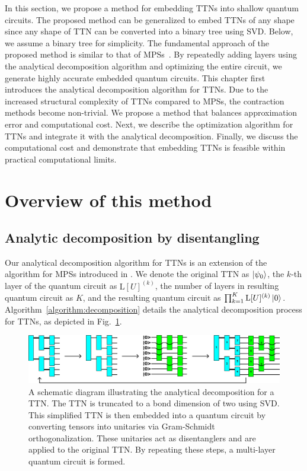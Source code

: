 \documentclass[12pt,dvipdfmx,twoside,openright]{report}
\begin{document}
In this section, we propose a method for embedding TTNs into shallow quantum circuits.
The proposed method can be generalized to embed TTNs of any shape since any shape of TTN can be converted into a binary tree using SVD.
Below, we assume a binary tree for simplicity.
The fundamental approach of the proposed method is similar to that of MPSs~\cite{mpsdecomp}. 
By repeatedly adding layers using the analytical decomposition algorithm and optimizing the entire circuit, we generate highly accurate embedded quantum circuits.
This chapter first introduces the analytical decomposition algorithm for TTNs.
Due to the increased structural complexity of TTNs compared to MPSs, the contraction methods become non-trivial. 
We propose a method that balances approximation error and computational cost.
Next, we describe the optimization algorithm for TTNs and integrate it with the analytical decomposition.
Finally, we discuss the computational cost and demonstrate that embedding TTNs is feasible within practical computational limits.

\section{Overview of this method}


\subsection{Analytic decomposition by disentangling}
Our analytical decomposition algorithm for TTNs is an extension of the algorithm for MPSs introduced in \cite{EncodingMPS}.
We denote the original TTN as $\ket{\psi_0}$, the $k$-th layer of the quantum circuit as $\mathrm{L}[U]^{(k)}$, the number of layers in resulting quantum circuit as $K$, and the resulting quantum circuit as $\prod_{k=1}^K \mathrm{L}[U]^{(k)}\ket{0}$.
Algorithm~\ref{algorithm:decomposition} details the analytical decomposition process for TTNs, as depicted in Fig.~\ref{fig:decomposition-a}.

\begin{figure}
    \centering
    \includegraphics[width=\linewidth]{fig-decomposition-a.pdf}
    \caption{A schematic diagram illustrating the analytical decomposition for a TTN.
    The TTN is truncated to a bond dimension of two using SVD. This simplified TTN is then embedded into a quantum circuit by converting tensors into unitaries via Gram-Schmidt orthogonalization. These unitaries act as disentanglers and are applied to the original TTN. By repeating these steps, a multi-layer quantum circuit is formed.
    }
    \label{fig:decomposition-a}
\end{figure}
\end{document}
